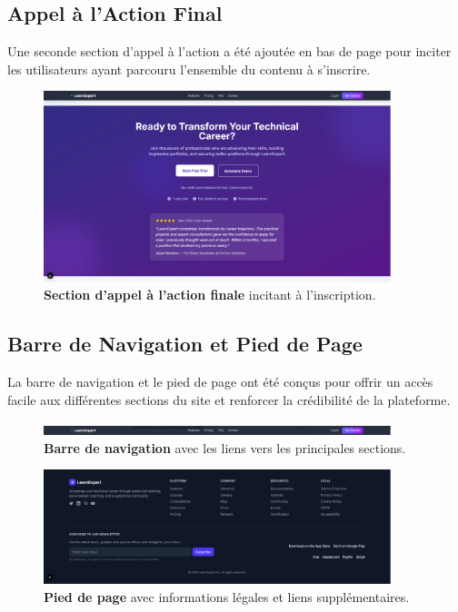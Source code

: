 \subsection{Appel à l'Action Final}
Une seconde section d'appel à l'action a été ajoutée en bas de page pour inciter les utilisateurs ayant parcouru l'ensemble du contenu à s'inscrire.

\begin{figure}[h!]
  \centering
  \includegraphics[width=0.9\textwidth,keepaspectratio]{week_2_img/second_call_of_action.png}
  \caption{\textbf{Section d'appel à l'action finale} incitant à l'inscription.}
  \label{fig:final_cta}
\end{figure}

\subsection{Barre de Navigation et Pied de Page}
La barre de navigation et le pied de page ont été conçus pour offrir un accès facile aux différentes sections du site et renforcer la crédibilité de la plateforme.

\begin{figure}[h!]
  \centering
  \includegraphics[width=0.9\textwidth,keepaspectratio]{week_2_img/navbar.png}
  \caption{\textbf{Barre de navigation} avec les liens vers les principales sections.}
  \label{fig:navbar}
\end{figure}

\begin{figure}[h!]
  \centering
  \includegraphics[width=0.9\textwidth,keepaspectratio]{week_2_img/foter.png}
  \caption{\textbf{Pied de page} avec informations légales et liens supplémentaires.}
  \label{fig:footer}
\end{figure}

